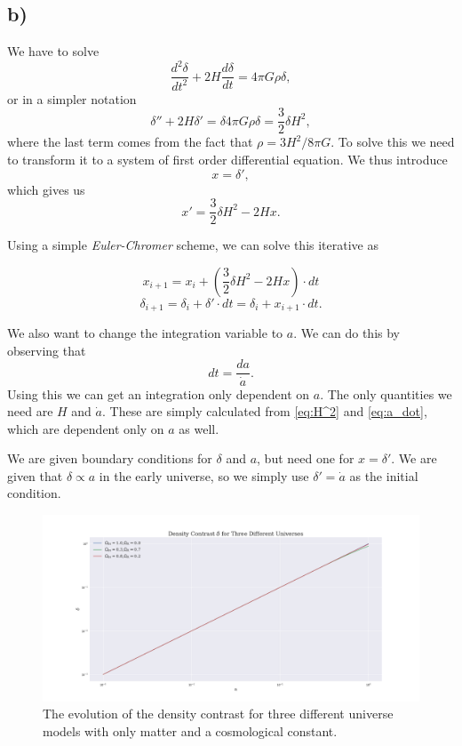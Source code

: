 \documentclass[a4paper,norsk, 10pt]{article}
\begin{document}
\subsection{b)}
We have to solve 
\begin{equation}
\frac{d^2 \delta}{dt^2} + 2H\frac{d\delta}{dt} = 4\pi G \rho \delta,
\end{equation}
or in a simpler notation
\begin{equation}
\delta '' + 2H \delta ' = \delta 4\pi G\rho \delta = \frac{3}{2}\delta H^2,
\end{equation}
where the last term comes from the fact that $\rho = 3H^2/8\pi G$. To solve this we need to transform it to a system of first order differential equation. We thus introduce
\begin{equation}
x = \delta',
\end{equation}
which gives us
\begin{equation}
x' = \frac{3}{2}\delta H^2 - 2Hx.
\end{equation}

Using a simple \textit{Euler-Chromer} scheme, we can solve this iterative as

\begin{equation}
x_{i+1} = x_{i} + \left(\frac{3}{2}\delta H^2 - 2Hx\right)\cdot dt
\end{equation}
\begin{equation}
\delta_{i+1} = \delta_{i} + \delta ' \cdot dt = \delta_{i} + x_{i+1} \cdot dt.
\end{equation}

We also want to change the integration variable to $a$. We can do this by observing that
\begin{equation}
dt = \frac{da}{\dot{a}}.
\end{equation}
Using this we can get an integration only dependent on $a$. The only quantities we need are $H$ and $\dot{a}$. These are simply calculated from \eqref{eq:H^2} and \eqref{eq:a_dot}, which are dependent only on $a$ as well.

We are given boundary conditions for $\delta$ and $a$, but need one for $x = \delta '$. We are given that $\delta \propto a$ in the early universe, so we simply use $\delta' = \dot{a}$ as the initial condition.

\begin{figure}[!h]
\centering
\includegraphics[scale=0.25]{a_v_delta}
\caption{The evolution of the density contrast for three different universe models with only matter and a cosmological constant.}\label{fig:a_v_delta}
\end{figure}
\end{document}
